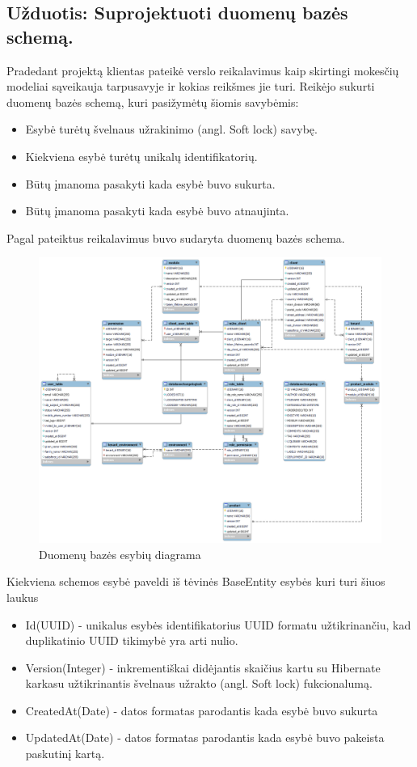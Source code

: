 \documentclass{VUMIFPSkursinis}
\begin{document}
	\subsection{Užduotis: Suprojektuoti duomenų bazės schemą.}
		Pradedant projektą klientas pateikė verslo reikalavimus kaip skirtingi mokesčių modeliai sąveikauja tarpusavyje ir kokias reikšmes jie turi.
		Reikėjo sukurti duomenų bazės schemą, kuri pasižymėtų šiomis savybėmis:
		\begin{itemize}
			\item{Esybė turėtų švelnaus užrakinimo (angl. Soft lock) savybę.}
			\item{Kiekviena esybė turėtų unikalų identifikatorių.}
			\item{Būtų įmanoma pasakyti kada esybė buvo sukurta.}
			\item{Būtų įmanoma pasakyti kada esybė buvo atnaujinta.}
		\end{itemize}

		Pagal pateiktus reikalavimus buvo sudaryta duomenų bazės schema.

		\begin{figure}
			\centering
			\includegraphics[scale=0.4]{img/db}
			\caption{Duomenų bazės esybių diagrama} %
			\label{img:kurimoProcesas}
		\end{figure}

		Kiekviena schemos esybė paveldi iš tėvinės BaseEntity esybės kuri turi šiuos laukus
		\begin{itemize}
			\item{Id(UUID) - unikalus esybės identifikatorius UUID formatu užtikrinančiu, kad duplikatinio UUID tikimybė yra arti nulio.}
			\item{Version(Integer) - inkrementiškai didėjantis skaičius kartu su Hibernate karkasu užtikrinantis švelnaus užrakto (angl. Soft lock) fukcionalumą.}
			\item{CreatedAt(Date) - datos formatas parodantis kada esybė buvo sukurta}
			\item{UpdatedAt(Date) - datos formatas parodantis kada esybė buvo pakeista paskutinį kartą.}
		\end{itemize}
\end{document}
